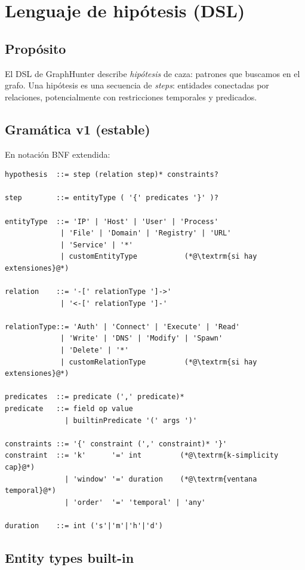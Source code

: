 \chapter{Lenguaje de hipótesis (DSL)}
\label{sec:dsl}

\section{Propósito}

El DSL de GraphHunter describe \emph{hipótesis} de caza: patrones
que buscamos en el grafo. Una hipótesis es una secuencia de
\emph{steps}: entidades conectadas por relaciones, potencialmente
con restricciones temporales y predicados.

\section{Gramática v1 (estable)}

En notación BNF extendida:

\begin{lstlisting}[basicstyle=\ttfamily\small]
hypothesis  ::= step (relation step)* constraints?

step        ::= entityType ( '{' predicates '}' )?

entityType  ::= 'IP' | 'Host' | 'User' | 'Process'
             | 'File' | 'Domain' | 'Registry' | 'URL'
             | 'Service' | '*'
             | customEntityType           (*@\textrm{si hay extensiones}@*)

relation    ::= '-[' relationType ']->'
             | '<-[' relationType ']-'

relationType::= 'Auth' | 'Connect' | 'Execute' | 'Read'
             | 'Write' | 'DNS' | 'Modify' | 'Spawn'
             | 'Delete' | '*'
             | customRelationType         (*@\textrm{si hay extensiones}@*)

predicates  ::= predicate (',' predicate)*
predicate   ::= field op value
              | builtinPredicate '(' args ')'

constraints ::= '{' constraint (',' constraint)* '}'
constraint  ::= 'k'      '=' int         (*@\textrm{k-simplicity cap}@*)
              | 'window' '=' duration    (*@\textrm{ventana temporal}@*)
              | 'order'  '=' 'temporal' | 'any'

duration    ::= int ('s'|'m'|'h'|'d')
\end{lstlisting}

\section{Entity types built-in}


